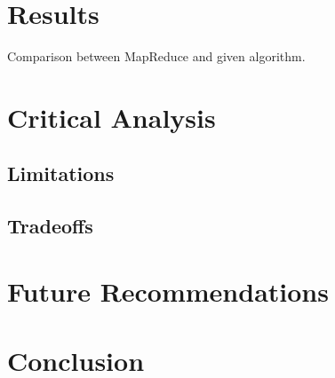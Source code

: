 \documentclass[10pt,twocolumn]{witseiepaper}
\begin{document}
%
%

\section{Results}

Comparison between MapReduce and given algorithm.

\section{Critical Analysis}

\subsection{Limitations}

\subsection{Tradeoffs}

\section{Future Recommendations}

\section{Conclusion}
\end{document}
